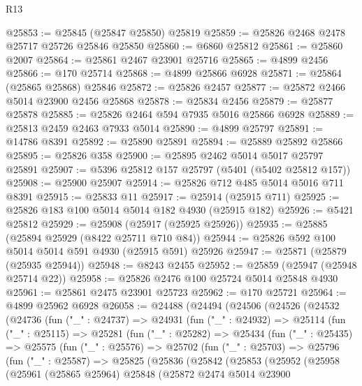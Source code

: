 \begin{lexlean}{R13}
\begin{coremodule}
@25853 := @25845 (@25847 @25850) @25819
@25859 := @25826 @2468 @2478 @25717 @25726 @25846 @25850
@25860 := @6860 @25812
@25861 := @25860 @2007
@25864 := @25861 @2467 @23901 @25716
@25865 := @4899 @2456
@25866 := @170 @25714
@25868 := @4899 @25866 @6928
@25871 := @25864 (@25865 @25868) @25846
@25872 := @25826 @2457
@25877 := @25872 @2466 @5014 @23900 @2456 @25868
@25878 := @25834 @2456
@25879 := @25877 @25878
@25885 := @25826 @2464 @594 @7935 @5016 @25866 @6928
@25889 := @25813 @2459 @2463 @7933 @5014
@25890 := @4899 @25797
@25891 := @14786 @8391
@25892 := @25890 @25891
@25894 := @25889 @25892 @25866
@25895 := @25826 @358
@25900 := @25895 @2462 @5014 @5017 @25797 @25891
@25907 := @5396 @25812 @157 @25797 (@5401 (@5402 @25812 @157))
@25908 := @25900 @25907
@25914 := @25826 @712 @485 @5014 @5016 @711 @8391
@25915 := @25833 @11
@25917 := @25914 (@25915 @711)
@25925 := @25826 @183 @100 @5014 @5014 @182 @4930 (@25915 @182)
@25926 := @5421 @25812
@25929 := @25908 (@25917 (@25925 @25926))
@25935 := @25885 (@25894 @25929 (@8422 @25711 @710 @84))
@25944 := @25826 @592 @100 @5014 @5014 @591 @4930 (@25915 @591) @25926
@25947 := @25871 (@25879 (@25935 @25944))
@25948 := @8243 @2455
@25952 := @25859 (@25947 (@25948 @25714 @22))
@25958 := @25826 @2476 @100 @25724 @5014 @25848 @4930
@25961 := @25861 @2475 @23901 @25723
@25962 := @170 @25721
@25964 := @4899 @25962 @6928
@26058 := @24488
    (@24494
      (@24506
        (@24526
          (@24532
            (@24736
              (fun ("_" : @24737) =>
              @24931
                (fun ("_" : @24932) =>
                @25114
                  (fun ("_" : @25115) =>
                  @25281
                    (fun ("_" : @25282) =>
                    @25434
                      (fun ("_" : @25435) =>
                      @25575
                        (fun ("_" : @25576) =>
                        @25702
                          (fun ("_" : @25703) =>
                          @25796
                            (fun ("_" : @25587) =>
                            @25825
                              (@25836
                                (@25842
                                  (@25853
                                    (@25952
                                      (@25958
                                        (@25961
                                          (@25865 @25964)
                                          @25848
                                          (@25872
                                            @2474
                                            @5014
                                            @23900

\end{coremodule}
\end{lexlean}
